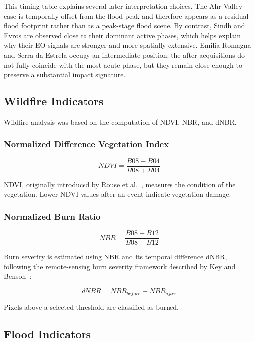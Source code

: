 \documentclass[12pt]{article}
\begin{document}
This timing table explains several later interpretation choices. The Ahr Valley case is temporally offset from the flood peak and therefore appears as a residual flood footprint rather than as a peak-stage flood scene. By contrast, Sindh and Evros are observed close to their dominant active phases, which helps explain why their EO signals are stronger and more spatially extensive. Emilia-Romagna and Serra da Estrela occupy an intermediate position: the after acquisitions do not fully coincide with the most acute phase, but they remain close enough to preserve a substantial impact signature.

\subsection{Wildfire Indicators}

Wildfire analysis was based on the computation of NDVI, NBR, and dNBR.

\subsubsection{Normalized Difference Vegetation Index}

\begin{equation}
NDVI = \frac{B08 - B04}{B08 + B04}
\end{equation}

NDVI, originally introduced by Rouse et al.~\cite{rouse1974}, measures the condition of the vegetation. Lower NDVI values after an event indicate vegetation damage.

\subsubsection{Normalized Burn Ratio}

\begin{equation}
NBR = \frac{B08 - B12}{B08 + B12}
\end{equation}

Burn severity is estimated using NBR and its temporal difference dNBR, following the remote-sensing burn severity framework described by Key and Benson~\cite{key2006}:

\begin{equation}
dNBR = NBR_{before} - NBR_{after}
\end{equation}

Pixels above a selected threshold are classified as burned.

\subsection{Flood Indicators}
\end{document}
